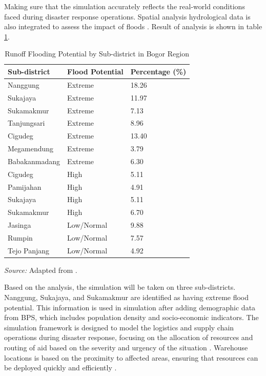 \documentclass[journal,final,a4paper,twoside,11pt]{IEEEtran}
\begin{document}
Making sure that the simulation accurately reflects the real-world conditions faced during disaster response operations. Spatial analysis hydrological data is also integrated to assess the impact of floods \cite{alkaesi2021spatial}. Result of analysis is shown in table \ref{tab:analysis}.
\begin{table}[htbp]
\caption{Runoff Flooding Potential by Sub-district in Bogor Region}
\begin{center}
\begin{tabular}{|m{2.5cm}|m{2cm}|m{2cm}|}
\hline
\textbf{Sub-district} & \textbf{Flood Potential} & \textbf{Percentage (\%)} \\
\hline
Nanggung & Extreme & 18.26 \\
\hline Sukajaya & Extreme & 11.97 \\
\hline Sukamakmur & Extreme & 7.13 \\
\hline Tanjungsari & Extreme & 8.96 \\
\hline Cigudeg & Extreme & 13.40 \\
\hline Megamendung & Extreme & 3.79 \\
\hline Babakanmadang & Extreme & 6.30 \\
\hline
Cigudeg & High & 5.11 \\
\hline Pamijahan & High & 4.91 \\
\hline Sukajaya & High & 5.11 \\
\hline Sukamakmur & High & 6.70 \\
\hline
Jasinga & Low/Normal & 9.88 \\
\hline Rumpin & Low/Normal & 7.57 \\
\hline Tejo Panjang & Low/Normal & 4.92 \\
\hline
\end{tabular}
\vspace{0.2cm}

\footnotesize{\textit{Source:} Adapted from \cite{alkaesi2021spatial}.}
\label{tab:analysis}
\end{center}
\end{table}

Based on the analysis, the simulation will be taken on three sub-districts. Nanggung, Sukajaya, and Sukamakmur are identified as having extreme flood potential. This information is used in simulation after adding demographic data from BPS, which includes population density and socio-economic indicators. The simulation framework is designed to model the logistics and supply chain operations during disaster response, focusing on the allocation of resources and routing of aid based on the severity and urgency of the situation \cite{park2021architectural}. Warehouse locations is based on the proximity to affected areas, ensuring that resources can be deployed quickly and efficiently \cite{halawa2020introduction}.  
\end{document}
